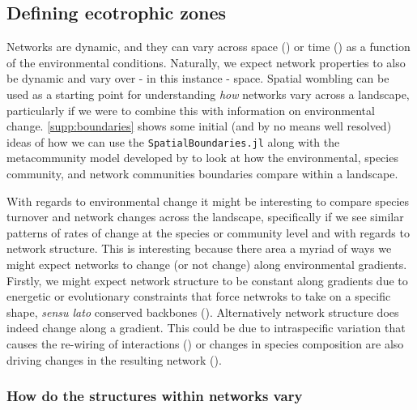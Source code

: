 \begin{refsection}
\subsection{Defining ecotrophic zones}\label{Defining-ecotrophic-zones}

Networks are dynamic, and they can vary across space (\cite{Golubski2016EcoNet, Vazquez2007SpeAbu}) or time (\cite{Poisot2015Species, Trojelsgaard2016EcoNet}) as a function of the environmental conditions. Naturally, we expect network properties to also be dynamic and vary over - in this instance - space. Spatial wombling can be used as a starting point for understanding \emph{how} networks vary across a landscape, particularly if we were to combine this with information on environmental change. \autoref{supp:boundaries} shows some initial (and by no means well resolved) ideas of how we can use the \texttt{SpatialBoundaries.jl} along with the metacommunity model developed by \cite{Thompson2017Dispersal} to look at how the environmental, species community, and network communities boundaries compare within a landscape.

With regards to environmental change it might be interesting to compare species turnover and network changes across the landscape, specifically if we see similar patterns of rates of change at the species or community level and with regards to network structure. This is interesting because there area a myriad of ways we might expect networks to change (or not change) along environmental gradients. Firstly, we might expect network structure to be constant along gradients due to energetic or evolutionary constraints that force netwroks to take on a specific shape, \emph{sensu lato} conserved backbones (\cite{BramonMora2018Identifying}). Alternatively network structure does indeed change along a gradient. This could be due to intraspecific variation that causes the re-wiring of interactions (\cite{Bolnick2011WhyInt}) or changes in species composition are also driving changes in the resulting network (\cite{Martins2022Global}).

\subsubsection{How do the structures within networks vary}


\end{refsection}
